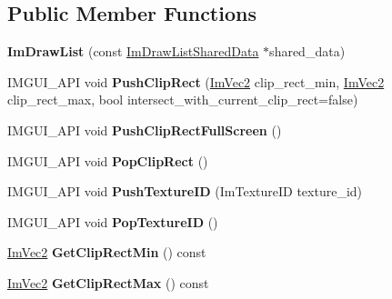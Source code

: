 \subsection*{Public Member Functions}
\begin{DoxyCompactItemize}
\item 
\mbox{\label{structImDrawList_a7c2af665f2c3e3bb5fc8aa34ef6dac91}} 
{\bfseries Im\+Draw\+List} (const \hyperlink{structImDrawListSharedData}{Im\+Draw\+List\+Shared\+Data} $\ast$shared\+\_\+data)
\item 
\mbox{\label{structImDrawList_acb34e2d3708616cae4567f3b4af06962}} 
I\+M\+G\+U\+I\+\_\+\+A\+PI void {\bfseries Push\+Clip\+Rect} (\hyperlink{structImVec2}{Im\+Vec2} clip\+\_\+rect\+\_\+min, \hyperlink{structImVec2}{Im\+Vec2} clip\+\_\+rect\+\_\+max, bool intersect\+\_\+with\+\_\+current\+\_\+clip\+\_\+rect=false)
\item 
\mbox{\label{structImDrawList_a0ab1ab409f0e269755e50a77901bae39}} 
I\+M\+G\+U\+I\+\_\+\+A\+PI void {\bfseries Push\+Clip\+Rect\+Full\+Screen} ()
\item 
\mbox{\label{structImDrawList_a44f40c59ca755f559020f5a7fa81103a}} 
I\+M\+G\+U\+I\+\_\+\+A\+PI void {\bfseries Pop\+Clip\+Rect} ()
\item 
\mbox{\label{structImDrawList_a7ac41e329a9df911b4823ef0150cee16}} 
I\+M\+G\+U\+I\+\_\+\+A\+PI void {\bfseries Push\+Texture\+ID} (Im\+Texture\+ID texture\+\_\+id)
\item 
\mbox{\label{structImDrawList_ade9286c5ca58753f7bd571b30e2ff76c}} 
I\+M\+G\+U\+I\+\_\+\+A\+PI void {\bfseries Pop\+Texture\+ID} ()
\item 
\mbox{\label{structImDrawList_a9d83896d3eb434a9e1072d56523a2754}} 
\hyperlink{structImVec2}{Im\+Vec2} {\bfseries Get\+Clip\+Rect\+Min} () const
\item 
\mbox{\label{structImDrawList_a8e484a61eab501c1c1c416a8b45bb08e}} 
\hyperlink{structImVec2}{Im\+Vec2} {\bfseries Get\+Clip\+Rect\+Max} () const
\item 
\mbox{\label{structImDrawList_aa21e5a1c6e00239581f97d344fc0db61}} 

\end{DoxyCompactItemize}
